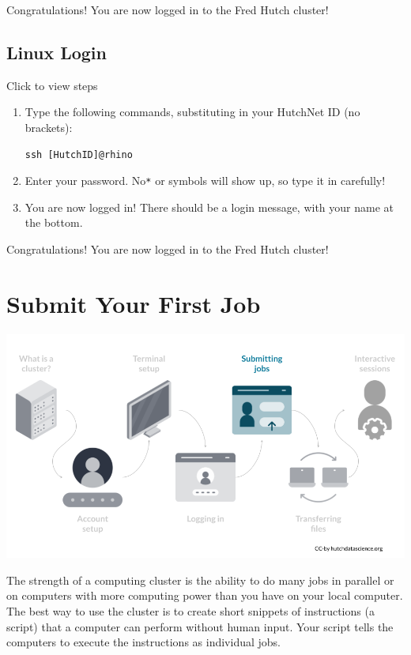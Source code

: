 \documentclass[
]{book}
\begin{document}
Congratulations! You are now logged in to the Fred Hutch cluster!

\hypertarget{linux-login}{%
\section{Linux Login}\label{linux-login}}

Click to view steps

\begin{enumerate}
\def\labelenumi{\arabic{enumi}.}
\item
  Type the following commands, substituting in your HutchNet ID (no brackets):

\begin{verbatim}
ssh [HutchID]@rhino
\end{verbatim}
\item
  Enter your password. No\texttt{*} or symbols will show up, so type it in carefully!\\
\item
  You are now logged in! There should be a login message, with your name at the bottom.
\end{enumerate}

Congratulations! You are now logged in to the Fred Hutch cluster!

\hypertarget{submit-your-first-job}{%
\chapter{Submit Your First Job}\label{submit-your-first-job}}

\begin{center}\includegraphics[width=0.8\linewidth]{resources/images/05-first-job_files/figure-latex//1BQxrVYdKZTbpCaF-i_q9w7s9x034lEXpQZDU-Sl09cs_gff2211b72f_1_229} \end{center}

The strength of a computing cluster is the ability to do many jobs in parallel or on computers with more computing power than you have on your local computer. The best way to use the cluster is to create short snippets of instructions (a script) that a computer can perform without human input. Your script tells the computers to execute the instructions as individual jobs.
\end{document}

